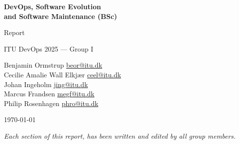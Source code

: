 \documentclass[11pt,a4paper]{article}
\begin{document}
\begin{titlepage}
    \centering
    \vspace*{3cm}
    {\Huge\bfseries DevOps, Software Evolution\\
    and Software Maintenance (BSc)\par}

    \vspace{1cm}

    {\Large Report\par}
    {\Large ITU DevOps 2025 --- Group I\par}
    
    \vspace*{1cm}

    \large
    Benjamin Ormstrup \quad \href{mailto:beor@itu.dk}{beor@itu.dk} \\[0.3cm]
    Cecilie Amalie Wall Elkjær \quad \href{mailto:ceel@itu.dk}{ceel@itu.dk} \\[0.3cm]
    Johan Ingeholm \quad \href{mailto:jing@itu.dk}{jing@itu.dk} \\[0.3cm]
    Marcus Frandsen \quad \href{mailto:megf@itu.dk}{megf@itu.dk} \\[0.3cm]
    Philip Rosenhagen \quad \href{mailto:phro@itu.dk}{phro@itu.dk}

    \vfill

    {\large \today\par}

\end{titlepage}




\tableofcontents
\newpage


\textit{Each section of this report, has been written and edited by all group members.}








\end{document}
